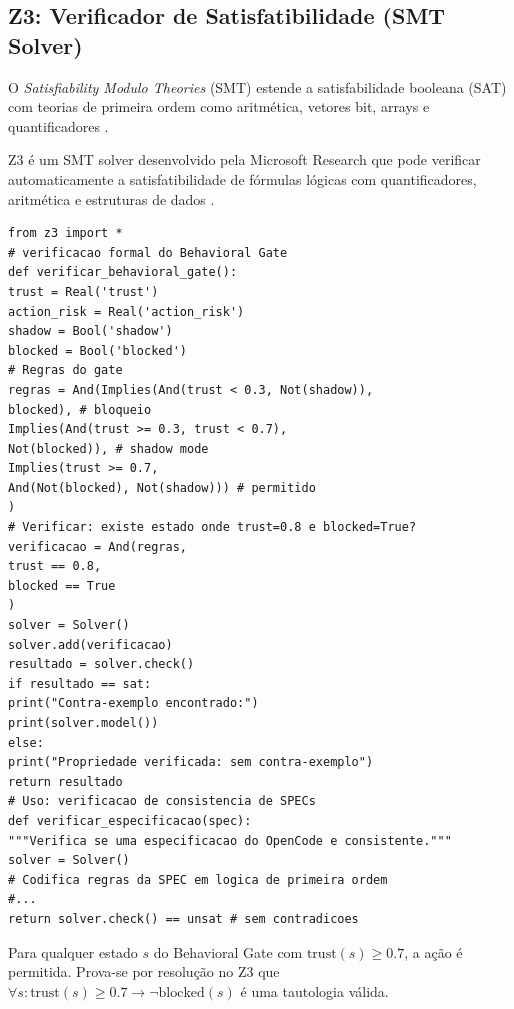 \subsection{Z3: Verificador de Satisfatibilidade (SMT Solver)}
\begin{definicao}[SMT]
O \textit{Satisfiability Modulo Theories} (SMT) estende a satisfabilidade
booleana (SAT) com teorias de primeira ordem como aritmética, vetores
bit, arrays e quantificadores \cite{demoura2008z3}.
\end{definicao}
Z3 é um SMT solver desenvolvido pela Microsoft Research que pode verificar
automaticamente a satisfatibilidade de fórmulas lógicas com quantificadores,
aritmética e estruturas de dados \cite{demoura2008z3}.
\begin{lstlisting}[style=pythonstyle]
from z3 import *
# verificacao formal do Behavioral Gate
def verificar_behavioral_gate():
trust = Real('trust')
action_risk = Real('action_risk')
shadow = Bool('shadow')
blocked = Bool('blocked')
# Regras do gate
regras = And(Implies(And(trust < 0.3, Not(shadow)),
blocked), # bloqueio
Implies(And(trust >= 0.3, trust < 0.7),
Not(blocked)), # shadow mode
Implies(trust >= 0.7,
And(Not(blocked), Not(shadow))) # permitido
)
# Verificar: existe estado onde trust=0.8 e blocked=True?
verificacao = And(regras,
trust == 0.8,
blocked == True
)
solver = Solver()
solver.add(verificacao)
resultado = solver.check()
if resultado == sat:
print("Contra-exemplo encontrado:")
print(solver.model())
else:
print("Propriedade verificada: sem contra-exemplo")
return resultado
# Uso: verificacao de consistencia de SPECs
def verificar_especificacao(spec):
"""Verifica se uma especificacao do OpenCode e consistente."""
solver = Solver()
# Codifica regras da SPEC em logica de primeira ordem
#...
return solver.check() == unsat # sem contradicoes
\end{lstlisting}
\begin{proposicao}
Para qualquer estado $s$ do Behavioral Gate com $\text{trust}(s) \geq 0.7$,
a ação é permitida. Prova-se por resolução no Z3 que $\forall s:
\text{trust}(s) \geq 0.7 \to \neg\text{blocked}(s)$ é uma tautologia
válida.
\end{proposicao}
